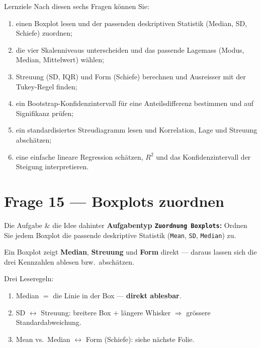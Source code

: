 \documentclass[aspectratio=169,11pt]{beamer}
\begin{document}
\begin{frame}{Lernziele}
Nach diesen sechs Fragen können Sie:
\begin{enumerate}
  \item einen \alert{Boxplot lesen} und der passenden deskriptiven Statistik
        (Median, SD, Schiefe) zuordnen;
  \item die \alert{vier Skalenniveaus} unterscheiden und das passende
        \alert{Lagemass} (Modus, Median, Mittelwert) wählen;
  \item \alert{Streuung} (SD, IQR) und \alert{Form} (Schiefe) berechnen
        und \alert{Ausreisser} mit der Tukey-Regel finden;
  \item ein \alert{Bootstrap-Konfidenzintervall} für eine Anteilsdifferenz
        bestimmen und auf Signifikanz prüfen;
  \item ein \alert{standardisiertes Streudiagramm} lesen und Korrelation,
        Lage und Streuung abschätzen;
  \item eine \alert{einfache lineare Regression} schätzen, $R^2$ und das
        Konfidenzintervall der Steigung interpretieren.
\end{enumerate}
\end{frame}

\section{Frage 15 --- Boxplots zuordnen}

\begin{frame}{Die Aufgabe \& die Idee dahinter}
\textbf{Aufgabentyp \texttt{Zuordnung Boxplots}:} Ordnen Sie jedem Boxplot
die passende deskriptive Statistik (\texttt{Mean}, \texttt{SD},
\texttt{Median}) zu.

\vspace{0.3cm}
\begin{konzept}[Schlüssel]
Ein Boxplot zeigt \textbf{Median}, \textbf{Streuung} und \textbf{Form}
direkt --- daraus lassen sich die drei Kennzahlen ablesen bzw.\ abschätzen.
\end{konzept}

\vspace{0.2cm}
Drei Leseregeln:
\begin{enumerate}
  \item \alert{Median} $=$ die Linie in der Box --- \textbf{direkt ablesbar}.
  \item \alert{SD} $\leftrightarrow$ Streuung: breitere Box $+$ längere
        Whisker $\Rightarrow$ grössere Standardabweichung.
  \item \alert{Mean vs.\ Median} $\leftrightarrow$ Form (Schiefe): siehe
        nächste Folie.
\end{enumerate}
\end{frame}
\end{document}
